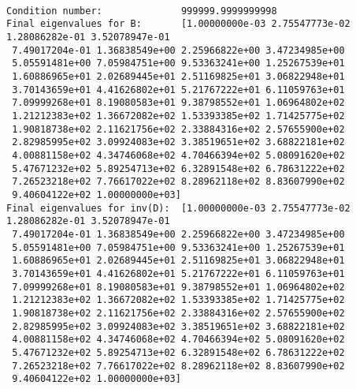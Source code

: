 \documentclass[11pt]{article}
\begin{document}
    \begin{center}
    \end{center}
    { \hspace*{\fill} \\}
    
    \begin{center}
    \end{center}
    { \hspace*{\fill} \\}
    
    \begin{center}
    \end{center}
    { \hspace*{\fill} \\}
    
    \begin{Verbatim}[commandchars=\\\{\}]
Condition number:              999999.9999999998
Final eigenvalues for B:       [1.00000000e-03 2.75547773e-02 1.28086282e-01 3.52078947e-01
 7.49017204e-01 1.36838549e+00 2.25966822e+00 3.47234985e+00
 5.05591481e+00 7.05984751e+00 9.53363241e+00 1.25267539e+01
 1.60886965e+01 2.02689445e+01 2.51169825e+01 3.06822948e+01
 3.70143659e+01 4.41626802e+01 5.21767222e+01 6.11059763e+01
 7.09999268e+01 8.19080583e+01 9.38798552e+01 1.06964802e+02
 1.21212383e+02 1.36672082e+02 1.53393385e+02 1.71425775e+02
 1.90818738e+02 2.11621756e+02 2.33884316e+02 2.57655900e+02
 2.82985995e+02 3.09924083e+02 3.38519651e+02 3.68822181e+02
 4.00881158e+02 4.34746068e+02 4.70466394e+02 5.08091620e+02
 5.47671232e+02 5.89254713e+02 6.32891548e+02 6.78631222e+02
 7.26523218e+02 7.76617022e+02 8.28962118e+02 8.83607990e+02
 9.40604122e+02 1.00000000e+03]
Final eigenvalues for inv(D):  [1.00000000e-03 2.75547773e-02 1.28086282e-01 3.52078947e-01
 7.49017204e-01 1.36838549e+00 2.25966822e+00 3.47234985e+00
 5.05591481e+00 7.05984751e+00 9.53363241e+00 1.25267539e+01
 1.60886965e+01 2.02689445e+01 2.51169825e+01 3.06822948e+01
 3.70143659e+01 4.41626802e+01 5.21767222e+01 6.11059763e+01
 7.09999268e+01 8.19080583e+01 9.38798552e+01 1.06964802e+02
 1.21212383e+02 1.36672082e+02 1.53393385e+02 1.71425775e+02
 1.90818738e+02 2.11621756e+02 2.33884316e+02 2.57655900e+02
 2.82985995e+02 3.09924083e+02 3.38519651e+02 3.68822181e+02
 4.00881158e+02 4.34746068e+02 4.70466394e+02 5.08091620e+02
 5.47671232e+02 5.89254713e+02 6.32891548e+02 6.78631222e+02
 7.26523218e+02 7.76617022e+02 8.28962118e+02 8.83607990e+02
 9.40604122e+02 1.00000000e+03]

    \end{Verbatim}
\end{document}

